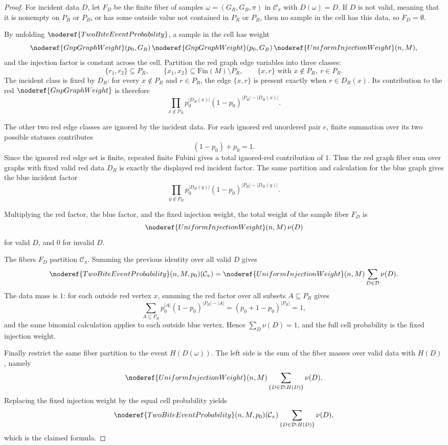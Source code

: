 \begin{proof}
For incident data \(D\), let \(F_D\) be the finite fiber of samples
\(\omega=(G_R,G_B,\pi)\) in \(\mathcal C_\pi\) with \(D(\omega)=D\).  If
\(D\) is not valid, meaning that it is nonempty on \(P_R\) or \(P_B\), or has
some outside value not contained in \(P_R\) or \(P_B\), then no sample in the
cell has this data, so \(F_D=\emptyset\).

By unfolding \(\noderef{TwoBiteEventProbability}\), a sample in the cell has weight
\[
\noderef{GnpGraphWeight}(p_0,G_R)\,
\noderef{GnpGraphWeight}(p_0,G_B)\,
\noderef{UniformInjectionWeight}(n,M),
\]
and the injection factor is constant across the cell.
Partition the red graph edge variables into three classes:
\[
\{r_1,r_2\}\subseteq P_R,\qquad
\{x_1,x_2\}\subseteq \mathrm{Fin}(M)\setminus P_R,\qquad
\{x,r\}\text{ with }x\notin P_R,\ r\in P_R.
\]
The incident class is fixed by \(D_R\): for every \(x\notin P_R\) and
\(r\in P_R\), the edge \(\{x,r\}\) is present exactly when
\(r\in D_R(x)\).  Its contribution to the red
\(\noderef{GnpGraphWeight}\) is therefore
\[
\prod_{x\notin P_R}
p_0^{|D_R(x)|}(1-p_0)^{|P_R|-|D_R(x)|}.
\]

The other two red edge classes are ignored by the incident data.  For each
ignored red unordered pair \(e\), finite summation over its two possible
statuses contributes
\[
(1-p_0)+p_0=1.
\]
Since the ignored red edge set is finite, repeated finite Fubini gives a total
ignored-red contribution of \(1\).  Thus the red graph fiber sum over graphs
with fixed valid red data \(D_R\) is exactly the displayed red incident
factor.  The same partition and calculation for the blue graph gives the blue
incident factor
\[
\prod_{y\notin P_B}
p_0^{|D_B(y)|}(1-p_0)^{|P_B|-|D_B(y)|}.
\]

Multiplying the red factor, the blue factor, and the fixed injection weight,
the total weight of the sample fiber \(F_D\) is
\[
\noderef{UniformInjectionWeight}(n,M)\,\nu(D)
\]
for valid \(D\), and \(0\) for invalid \(D\).

The fibers \(F_D\) partition \(\mathcal C_\pi\).  Summing the previous
identity over all valid \(D\) gives
\[
\noderef{TwoBiteEventProbability}(n,M,p_0)(\mathcal C_\pi)
=
\noderef{UniformInjectionWeight}(n,M)
\sum_{D\in\mathcal D}\nu(D).
\]
The data mass is \(1\): for each outside red vertex \(x\), summing the red
factor over all subsets \(A\subseteq P_R\) gives
\[
\sum_{A\subseteq P_R}p_0^{|A|}(1-p_0)^{|P_R|-|A|}
=(p_0+1-p_0)^{|P_R|}=1,
\]
and the same binomial calculation applies to each outside blue vertex.  Hence
\(\sum_D\nu(D)=1\), and the full cell probability is the fixed injection
weight.

Finally restrict the same fiber partition to the event \(H(D(\omega))\).  The
left side is the sum of the fiber masses over valid data with \(H(D)\), namely
\[
\noderef{UniformInjectionWeight}(n,M)
\sum_{\{D\in\mathcal D:H(D)\}}\nu(D).
\]
Replacing the fixed injection weight by the equal cell probability yields
\[
\noderef{TwoBiteEventProbability}(n,M,p_0)(\mathcal C_\pi)
\sum_{\{D\in\mathcal D:H(D)\}}\nu(D),
\]
which is the claimed formula.
\end{proof}
